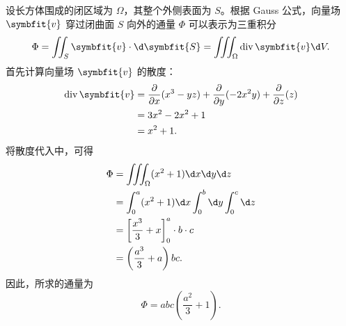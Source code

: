 \begin{solution}
    设长方体围成的闭区域为 $\Omega$，其整个外侧表面为 $S$。根据 Gauss 公式，向量场 $\symbfit{v}$ 穿过闭曲面 $S$ 向外的通量 $\Phi$ 可以表示为三重积分
    \begin{equation}
        \Phi = \iint_S \symbfit{v} \cdot \d \symbfit{S} = \iiint_{\Omega} \operatorname{div} \symbfit{v} \d V. \label{eq:gauss-1}
    \end{equation}
    首先计算向量场 $\symbfit{v}$ 的散度：
    \begin{equation}
        \begin{aligned}
            \operatorname{div} \symbfit{v} & = \frac{\partial}{\partial x} (x^3 - yz) + \frac{\partial}{\partial y} (-2x^2y) + \frac{\partial}{\partial z} (z) \\
                                           & = 3x^2 - 2x^2 + 1                                                                                                 \\
                                           & = x^2 + 1.
        \end{aligned}
    \end{equation}
    将散度代入中，可得
    \begin{equation}
        \begin{aligned}
            \Phi & = \iiint_{\Omega} (x^2 + 1) \d x \d y \d z             \\
                 & = \int_0^a (x^2 + 1) \d x \int_0^b \d y \int_0^c \d z  \\
                 & = \left[ \frac{x^3}{3} + x \right]_0^a \cdot b \cdot c \\
                 & = \left( \frac{a^3}{3} + a \right) bc.
        \end{aligned}
    \end{equation}
    因此，所求的通量为
    \begin{equation}
        \Phi = \boxed{abc \left( \frac{a^2}{3} + 1 \right)}.
    \end{equation}
\end{solution}

\endinput
